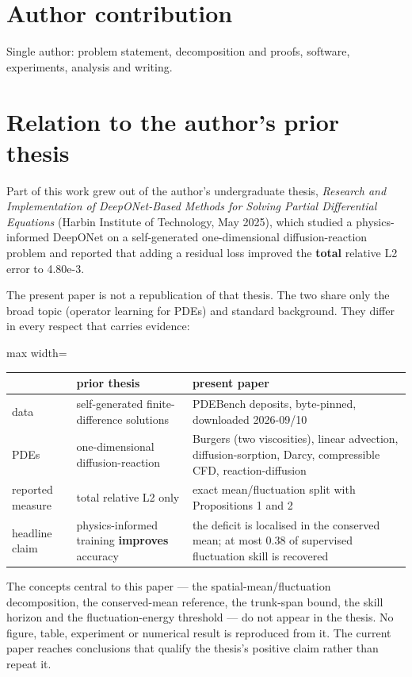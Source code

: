 \documentclass[preprint,12pt]{elsarticle}
\begin{document}
\section*{Author contribution}

Single author: problem statement, decomposition and proofs, software, experiments, analysis and writing.

\section*{Relation to the author's prior thesis}

Part of this work grew out of the author's undergraduate thesis, \emph{Research and Implementation of DeepONet-Based Methods for Solving Partial Differential Equations} (Harbin Institute of Technology, May 2025), which studied a physics-informed DeepONet on a self-generated one-dimensional diffusion-reaction problem and reported that adding a residual loss improved the \textbf{total} relative L2 error to 4.80e-3.

The present paper is not a republication of that thesis. The two share only the broad topic (operator learning for PDEs) and standard background. They differ in every respect that carries evidence:

\begin{center}
\begin{adjustbox}{max width=\linewidth}
\small
\begin{tabular}{lll}
\toprule
 & prior thesis & present paper \\
\midrule
data & self-generated finite-difference solutions & PDEBench deposits, byte-pinned, downloaded 2026-09/10 \\
PDEs & one-dimensional diffusion-reaction & Burgers (two viscosities), linear advection, diffusion-sorption, Darcy, compressible CFD, reaction-diffusion \\
reported measure & total relative L2 only & exact mean/fluctuation split with Propositions 1 and 2 \\
headline claim & physics-informed training \textbf{improves} accuracy & the deficit is localised in the conserved mean; at most 0.38 of supervised fluctuation skill is recovered \\
\bottomrule
\end{tabular}
\end{adjustbox}
\end{center}


The concepts central to this paper --- the spatial-mean/fluctuation decomposition, the conserved-mean reference, the trunk-span bound, the skill horizon and the fluctuation-energy threshold --- do not appear in the thesis. No figure, table, experiment or numerical result is reproduced from it. The current paper reaches conclusions that qualify the thesis's positive claim rather than repeat it.
\end{document}
